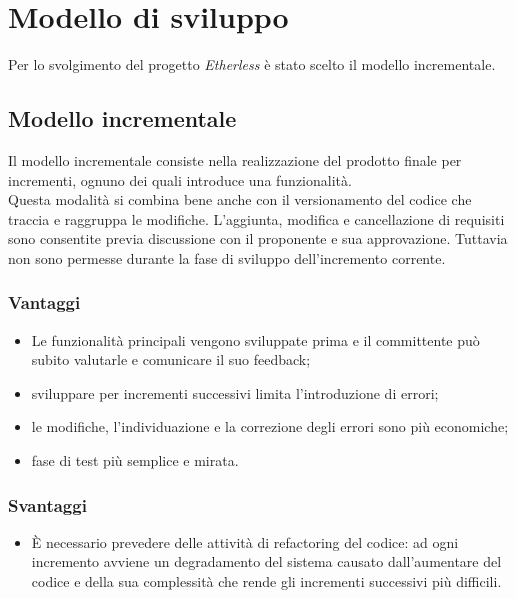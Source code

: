 \section{Modello di sviluppo}
Per lo svolgimento del progetto \textit{Etherless} è stato scelto il modello incrementale.
\subsection{Modello incrementale}
Il modello incrementale consiste nella realizzazione del prodotto finale per incrementi, ognuno dei quali introduce una funzionalità. \\Questa modalità si combina bene anche con il versionamento del codice che traccia e raggruppa le modifiche. L'aggiunta, modifica e cancellazione di requisiti sono consentite previa discussione con il proponente e sua approvazione. Tuttavia non sono permesse durante la fase di sviluppo dell'incremento corrente.
\subsubsection{Vantaggi}
\begin{itemize}
	\item Le funzionalità principali vengono sviluppate prima e il committente può subito valutarle e comunicare il suo feedback;
	\item sviluppare per incrementi successivi limita l'introduzione di errori;
	\item le modifiche, l'individuazione e la correzione degli errori sono più economiche;
	\item fase di test più semplice e mirata.
\end{itemize}
\subsubsection{Svantaggi}
\begin{itemize}
	\item È necessario prevedere delle attività di refactoring del codice: ad ogni incremento avviene un degradamento del sistema causato dall'aumentare del codice e della sua complessità che rende gli incrementi successivi più difficili.
\end{itemize}